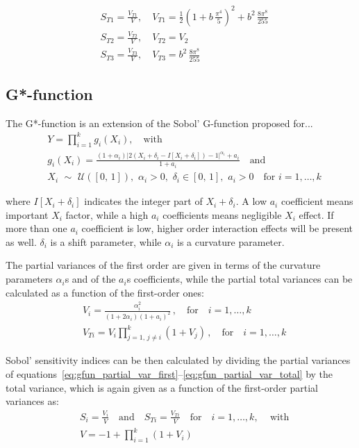 \begin{align}
	& S_{T1} = \frac{V_{T1}}{V},\quad V_{T1} = \frac{1}{2}\left(1+b\,\frac{\pi^4}{5}\right)^2 + b^2\,\frac{8\pi^8}{255} \\
	& S_{T2} = \frac{V_{T2}}{V},\quad V_{T2} = V_2 \\
	& S_{T3} = \frac{V_{T3}}{V},\quad V_{T3} = b^2\,\frac{8\pi^8}{255}
\end{align}

%
%
%
\subsection{G*-function}
The G*-function is an extension of the Sobol' G-function proposed for...
%
\begin{align}\label{eq:sobolgfun}
	& Y = \prod_{i=1}^{k}g_i(X_i),\quad\text{with} \\
	& g_i(X_i)=\frac{(1+\alpha_i)\vert 2(X_i+\delta_i-I[X_i+\delta_i])-1\vert^{\alpha_i}+a_i}{1+a_i}\quad\text{and} \\
	& X_i\,\,\sim\,\,\mathcal{U}([0,\,1]),\,\,\alpha_i > 0,\,\,\delta_i\in [0,\,1],\,\,a_i>0\quad\text{for}\,\,i=1,\dots,k
\end{align}

\vspace{0.2cm}\noindent
where $I[X_i+\delta_i]$ indicates the integer part of $X_i+\delta_i$. A low $a_i$ coefficient means important $X_i$ factor, while a high $a_i$ coefficients means negligible $X_i$ effect. If more than one $a_i$ coefficient is low, higher order interaction effects will be present as well. $\delta_i$ is a shift parameter, while $\alpha_i$ is a curvature parameter.

\vspace{0.2cm}
The partial variances of the first order are given in terms of the curvature parameters $\alpha_i$s and of the $a_i$s coefficients, while the partial total variances can be calculated as a function of the first-order ones:
%
\begin{align}
	& V_i = \frac{\alpha_i^2}{(1+2\alpha_i)(1 + a_i)^2}\,,\quad\text{for}\quad i=1,\dots,k \label{eq:gfun_partial_var_first}\\
	& V_{Ti} = V_i \prod_{j=1,\,j\neq i}^{k}(1 + V_j)\,,\quad\text{for}\quad i=1,\dots,k \label{eq:gfun_partial_var_total}
\end{align}

\vspace{0.2cm}\noindent
Sobol' sensitivity indices can be then calculated by dividing the partial variances of equations~\eqref{eq:gfun_partial_var_first}--\eqref{eq:gfun_partial_var_total} by the total variance, which is again given as a function of the first-order partial variances as:
%
\begin{align}
	& S_i = \frac{V_i}{V} \quad\text{and}\quad S_{Ti} = \frac{V_{Ti}}{V} \quad\text{for}\quad i=1,\dots,k,\,\quad\text{with} \\
	& V = -1 + \prod_{i=1}^{k}(1 + V_i) 
\end{align}

